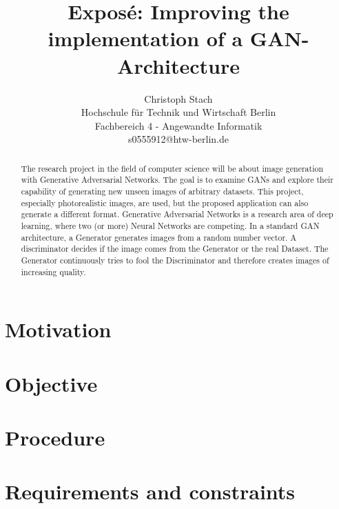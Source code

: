 \documentclass[]{article}
\begin{document}
\title{\textbf{Exposé: Improving the implementation of a GAN-Architecture}}

\author{
  Christoph Stach\\
  Hochschule für Technik und Wirtschaft Berlin\\
  Fachbereich 4 - Angewandte Informatik\\
  s0555912@htw-berlin.de
}
\maketitle

\begin{abstract}

\noindent
The research project in the field of computer science will be about image generation with Generative Adversarial Networks. The goal is to examine GANs and explore their capability of generating new unseen images of arbitrary datasets. This project, especially photorealistic images, are used, but the proposed application can also generate a different format. Generative Adversarial Networks is a research area of deep learning, where two (or more) Neural Networks are competing. In a standard GAN architecture, a Generator generates images from a random number vector. A discriminator decides if the image comes from the Generator or the real Dataset. The Generator continuously tries to fool the Discriminator and therefore creates images of increasing quality.

\end{abstract}


\section{Motivation}

\noindent


\section{Objective}

\noindent


\section{Procedure}

\noindent


\section{Requirements and constraints}
\end{document}
